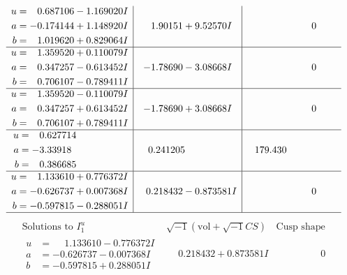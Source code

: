 \documentclass[1p]{elsarticle_modified}
\theoremstyle{definition}
\newcommand{\I}{\sqrt{-1}}
\begin{document}
$$\begin{array}{c|c|c}
\begin{aligned}
u &= \phantom{-}0.687106 - 1.169020 I \\
a &= -0.174144 + 1.148920 I \\
b &= \phantom{-}1.019620 + 0.829064 I\end{aligned}
 & \phantom{-}1.90151 + 9.52570 I & \phantom{-0.000000 } 0 \\ \hline\begin{aligned}
u &= \phantom{-}1.359520 + 0.110079 I \\
a &= \phantom{-}0.347257 - 0.613452 I \\
b &= \phantom{-}0.706107 - 0.789411 I\end{aligned}
 & -1.78690 - 3.08668 I & \phantom{-0.000000 } 0 \\ \hline\begin{aligned}
u &= \phantom{-}1.359520 - 0.110079 I \\
a &= \phantom{-}0.347257 + 0.613452 I \\
b &= \phantom{-}0.706107 + 0.789411 I\end{aligned}
 & -1.78690 + 3.08668 I & \phantom{-0.000000 } 0 \\ \hline\begin{aligned}
u &= \phantom{-}0.627714\phantom{ +0.000000I} \\
a &= -3.33918\phantom{ +0.000000I} \\
b &= \phantom{-}0.386685\phantom{ +0.000000I}\end{aligned}
 & \phantom{-}0.241205\phantom{ +0.000000I} & \phantom{-}179.430\phantom{ +0.000000I} \\ \hline\begin{aligned}
u &= \phantom{-}1.133610 + 0.776372 I \\
a &= -0.626737 + 0.007368 I \\
b &= -0.597815 - 0.288051 I\end{aligned}
 & \phantom{-}0.218432 - 0.873581 I & \phantom{-0.000000 } 0\\
 \hline 
 \end{array}$$\newpage$$\begin{array}{c|c|c}  
\text{Solutions to }I^u_{1}& \I (\text{vol} + \sqrt{-1}CS) & \text{Cusp shape}\\
 \hline 
\begin{aligned}
u &= \phantom{-}1.133610 - 0.776372 I \\
a &= -0.626737 - 0.007368 I \\
b &= -0.597815 + 0.288051 I\end{aligned}
 & \phantom{-}0.218432 + 0.873581 I & \phantom{-0.000000 } 0 \\ \hline\begin{aligned}

\end{aligned}
\end{array}$$
\end{document}
